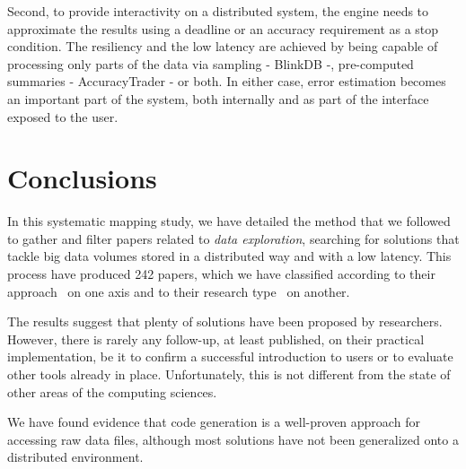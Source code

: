 Second, to provide interactivity on a distributed system, the engine 
needs to approximate the results using a deadline or an accuracy requirement as 
a stop condition. The resiliency and the low latency are achieved by 
being capable of processing only parts of the data via sampling - BlinkDB -, 
pre-computed summaries - AccuracyTrader - or both. In either case, error 
estimation becomes an important part of the system, both internally and as 
part of the interface exposed to the user.

\section{Conclusions}
\label{sec:conclusions}
In this systematic mapping study, we have detailed the method that we followed
to gather and filter papers related to \emph{data exploration}, searching
for solutions that tackle big data volumes stored in a distributed way and with
a low latency. This process have produced 242 papers, which we have classified
according to their approach~\cite{Idreos2015} on one axis and to their research
type~\cite{Wieringa2006} on another.

The results suggest that  plenty of solutions have been proposed by researchers.
However, there is rarely any follow-up, at least published, on their
practical implementation, be it to confirm a successful introduction to users
or to evaluate other tools already in place.
Unfortunately, this is not different from the state of other areas of the computing sciences.

We have found evidence that code generation is a well-proven approach for
accessing raw data files, although most solutions have not been generalized
onto a distributed environment.

